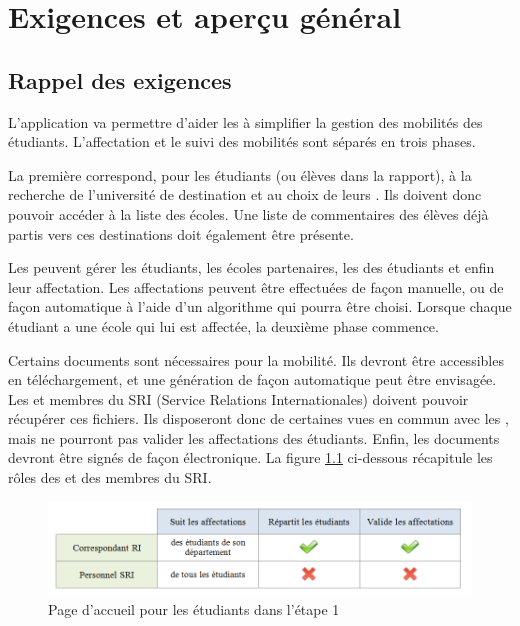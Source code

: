 \chapter{Exigences et aperçu général}
\label{chap::exigences}

\section{Rappel des exigences}

L'application va permettre d'aider les \ris à simplifier la gestion des mobilités des étudiants. L'affectation et le suivi des mobilités sont séparés en trois phases.

\bigbreak

La première correspond, pour les étudiants (ou élèves dans la rapport), à la recherche de l'université de destination et au choix de leurs \voe. Ils doivent donc pouvoir accéder à la liste des écoles. Une liste de commentaires des élèves déjà partis vers ces destinations doit également être présente.

Les \ris peuvent gérer les étudiants, les écoles partenaires, les \voe des étudiants et enfin leur affectation. Les affectations peuvent être effectuées de façon manuelle, ou de façon automatique à l'aide d'un algorithme qui pourra être choisi. Lorsque chaque étudiant a une école qui lui est affectée, la deuxième phase commence.
\bigbreak

Certains documents sont nécessaires pour la mobilité. Ils devront être accessibles en téléchargement, et une génération de façon automatique peut être envisagée. Les \ris et membres du SRI (Service Relations Internationales) doivent pouvoir récupérer ces fichiers. Ils disposeront donc de certaines vues en commun avec les \ris, mais ne pourront pas valider les affectations des étudiants. Enfin, les documents devront être signés de façon électronique. La figure \ref{fig::diffRI-SRI} ci-dessous récapitule les rôles des \ris et des membres du SRI.

\begin{figure}[H]
	\centering
	\includegraphics[scale=0.4]{roleRI-SRI.png}
	\caption{Page d'accueil pour les étudiants dans l'étape 1}
	\label{fig::diffRI-SRI}
\end{figure}
\bigbreak

